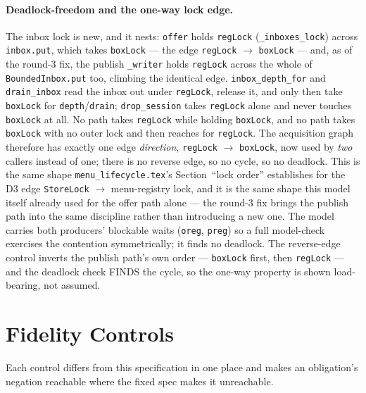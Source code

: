 \documentclass[a4paper,10pt,fleqn]{article}
\begin{document}
\paragraph{Deadlock-freedom and the one-way lock edge.}
\label{sec:lockorder}
The inbox lock is new, and it nests: \texttt{offer} holds \texttt{regLock}
(\texttt{\_inboxes\_lock}) across \texttt{inbox.put}, which takes
\texttt{boxLock} --- the edge \texttt{regLock} $\to$ \texttt{boxLock} --- and, as
of the round-3 fix, the publish \texttt{\_writer} holds \texttt{regLock} across
the whole of \texttt{BoundedInbox.put} too, climbing the identical edge.
\texttt{inbox\_depth\_for} and \texttt{drain\_inbox} read the inbox out under
\texttt{regLock}, release it, and only then take \texttt{boxLock} for
\texttt{depth}/\texttt{drain}; \texttt{drop\_session} takes \texttt{regLock}
alone and never touches \texttt{boxLock} at all. No path takes \texttt{regLock}
while holding \texttt{boxLock}, and no path takes \texttt{boxLock} with no outer
lock and then reaches for \texttt{regLock}. The acquisition graph therefore has
exactly one edge \emph{direction}, \texttt{regLock} $\to$ \texttt{boxLock}, now
used by \emph{two} callers instead of one; there is no reverse edge, so no
cycle, so no deadlock. This is the same shape \texttt{menu\_lifecycle.tex}'s
Section~``lock order'' establishes for the D3 edge \texttt{StoreLock} $\to$
menu-registry lock, and it is the same shape this model itself already used for
the offer path alone --- the round-3 fix brings the publish path into the same
discipline rather than introducing a new one. The model carries both
producers' blockable waits (\texttt{oreg}, \texttt{preg}) so a full model-check
exercises the contention symmetrically; it finds no deadlock. The reverse-edge
control inverts the publish path's own order --- \texttt{boxLock} first, then
\texttt{regLock} --- and the deadlock check FINDS the cycle, so the one-way
property is shown load-bearing, not assumed.

\section{Fidelity Controls}
\label{sec:fidelity}

Each control differs from this specification in one place and makes an
obligation's negation reachable where the fixed spec makes it unreachable.
\end{document}
